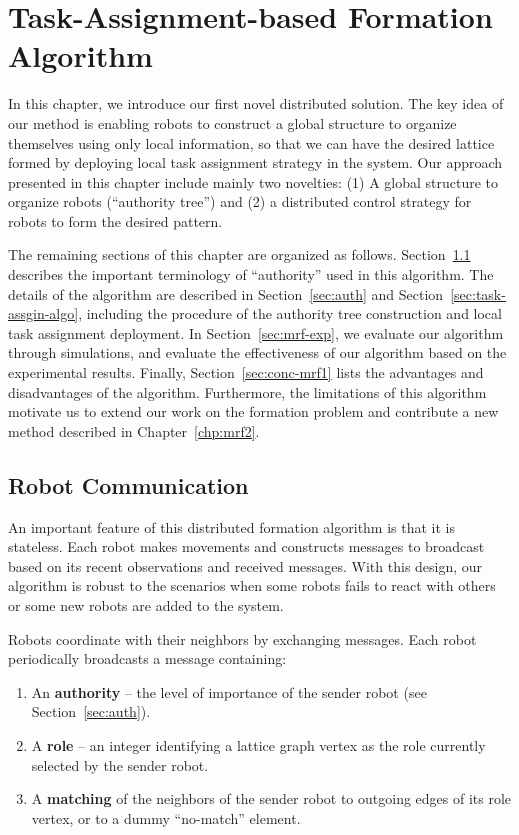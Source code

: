 \chapter{Task-Assignment-based Formation Algorithm}
\label{chp:mrf1}
In this chapter, we introduce our first novel distributed solution. 
%
The key idea of our method is enabling robots to construct a global structure to
organize themselves using only local information, so that we can have the
desired lattice formed by deploying local task assignment strategy in the system. 
%
Our approach presented in this chapter include mainly two novelties: (1) A
global structure to organize robots (``authority tree'') and (2) a distributed
control strategy for robots to form the desired pattern.


%
The remaining sections of this chapter are organized as follows. 
%
Section~\ref{sec:msg1} describes the important terminology of ``authority'' used in this algorithm.
The details of the algorithm are described in Section~\ref{sec:auth} and Section~\ref{sec:task-assgin-algo}, including the
procedure of the authority tree construction and local task assignment deployment. 
%
In Section~\ref{sec:mrf-exp}, we evaluate our algorithm through simulations, 
and evaluate the effectiveness of our algorithm based on the experimental results. 
%
Finally, Section~\ref{sec:conc-mrf1} lists the advantages and disadvantages of the algorithm. 
Furthermore, the limitations of this algorithm motivate us to extend our work on the formation problem and contribute a new method described in Chapter~\ref{chp:mrf2}.

\section{Robot Communication}
\label{sec:msg1}
An important feature of this distributed formation algorithm is that it is stateless.
%
Each robot makes movements and constructs messages to broadcast based on its recent observations and received messages.
%
With this design, our algorithm is robust to the scenarios when some robots fails to react with others or some new robots are added to the system.

Robots coordinate with their neighbors by exchanging messages. 
%
Each robot periodically broadcasts a message containing:
  \begin{enumerate}
  \item An \textbf{authority} -- the level of importance of the sender robot (see Section~\ref{sec:auth}).
  \item A \textbf{role} -- an integer identifying a lattice graph vertex as the role currently selected by the sender robot.
  \item A \textbf{matching} of the neighbors of the sender robot to outgoing edges of its
  role vertex, or to a dummy ``no-match'' element.
 \end{enumerate}

